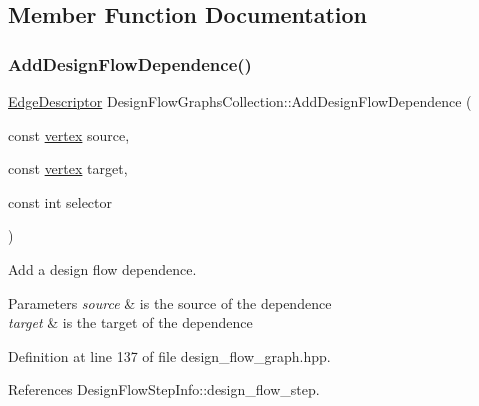 \subsection{Member Function Documentation}
\mbox{\label{classDesignFlowGraphsCollection_a03824b7b827aeb29bd51f97d3af75f30}} 
\subsubsection{\texorpdfstring{Add\+Design\+Flow\+Dependence()}{AddDesignFlowDependence()}}
{\footnotesize\ttfamily \hyperlink{graph_8hpp_a9eb9afea34e09f484b21f2efd263dd48}{Edge\+Descriptor} Design\+Flow\+Graphs\+Collection\+::\+Add\+Design\+Flow\+Dependence (\begin{DoxyParamCaption}\item[{const \hyperlink{graph_8hpp_abefdcf0544e601805af44eca032cca14}{vertex}}]{source,  }\item[{const \hyperlink{graph_8hpp_abefdcf0544e601805af44eca032cca14}{vertex}}]{target,  }\item[{const int}]{selector }\end{DoxyParamCaption})\hspace{0.3cm}{\ttfamily [inline]}}



Add a design flow dependence. 


\begin{DoxyParams}{Parameters}
{\em source} & is the source of the dependence \\
\hline
{\em target} & is the target of the dependence \\
\hline
\end{DoxyParams}


Definition at line 137 of file design\+\_\+flow\+\_\+graph.\+hpp.



References Design\+Flow\+Step\+Info\+::design\+\_\+flow\+\_\+step.

\mbox{\label{classDesignFlowGraphsCollection_abcc51a4113bec717c5ca63818d3543f9}} 
